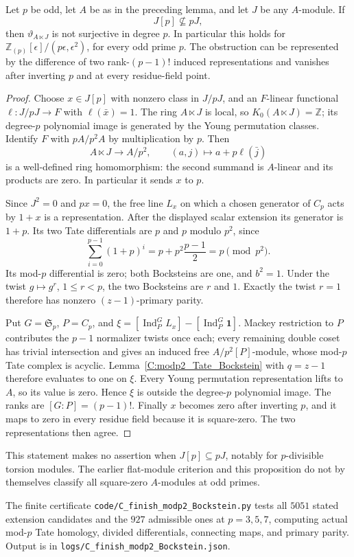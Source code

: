 \begin{proposition}
\label{C:odd_torsion_heightzero}
Let $p$ be odd, let $A$ be as in the preceding lemma, and let $J$
be any $A$-module. If
\[
 J[p]\not\subseteq pJ,
\]
then $\vartheta_{A\ltimes J}$ is not surjective in degree $p$.
In particular this holds for $\mathbb Z_{(p)}[\epsilon]/
(p\epsilon,\epsilon^2)$, for every odd prime $p$.
The obstruction can be represented by the difference of two
rank-$(p-1)!$ induced representations and vanishes after inverting
$p$ and at every residue-field point.
\end{proposition}
\begin{proof}
Choose $x\in J[p]$ with nonzero class in $J/pJ$, and an $F$-linear
functional $\ell:J/pJ\to F$ with $\ell(\bar x)=1$.
The ring $A\ltimes J$ is local, so $K_0(A\ltimes J)=\mathbb Z$;
its degree-$p$ polynomial image is generated by the Young
permutation classes.
Identify $F$ with $pA/p^2A$ by multiplication by $p$.
Then
\[
 A\ltimes J\longrightarrow A/p^2,
       \qquad (a,j)\longmapsto a+p\ell(\bar j)
\]
is a well-defined ring homomorphism: the second summand is
$A$-linear and its products are zero. In particular it sends $x$
to $p$.

Since $J^2=0$ and $px=0$, the free line $L_x$ on which a chosen
generator of $C_p$ acts by $1+x$ is a representation.
After the displayed scalar extension its generator is $1+p$.
Its two Tate differentials are $p$ and $p$ modulo $p^2$, since
\[
 \sum_{i=0}^{p-1}(1+p)^i
       =p+p^2\frac{p-1}{2}=p\pmod{p^2}.
\]
Its mod-$p$ differential is zero; both Bocksteins are one, and
$b^2=1$. Under the twist $g\mapsto g^r$, $1\le r<p$, the two
Bocksteins are $r$ and $1$. Exactly the twist $r=1$ therefore has
nonzero $(z-1)$-primary parity.

Put $G=\mathfrak S_p$, $P=C_p$, and
$\xi=[\operatorname{Ind}_P^G L_x]-[\operatorname{Ind}_P^G\mathbf1]$.
Mackey restriction to $P$ contributes the $p-1$ normalizer twists
once each; every remaining double coset has trivial intersection
and gives an induced free $A/p^2[P]$-module, whose mod-$p$ Tate
complex is acyclic. Lemma~\ref{C:modp2_Tate_Bockstein} with
$q=z-1$ therefore evaluates to one on $\xi$.
Every Young permutation representation lifts to $A$, so its value
is zero. Hence $\xi$ is outside the degree-$p$ polynomial image.
The ranks are $[G:P]=(p-1)!$. Finally $x$ becomes zero after
inverting $p$, and it maps to zero in every residue field because
it is square-zero. The two representations then agree.
\end{proof}

This statement makes no assertion when $J[p]\subseteq pJ$,
notably for $p$-divisible torsion modules. The earlier flat-module
criterion and this proposition do not by themselves classify all
square-zero $A$-modules at odd primes.

The finite certificate \texttt{code/C\_finish\_modp2\_Bockstein.py} tests all $5051$ stated extension candidates and the $927$ admissible ones at $p=3,5,7$, computing actual mod-$p$ Tate homology, divided differentials, connecting maps, and primary parity. Output is in \texttt{logs/C\_finish\_modp2\_Bockstein.json}.
